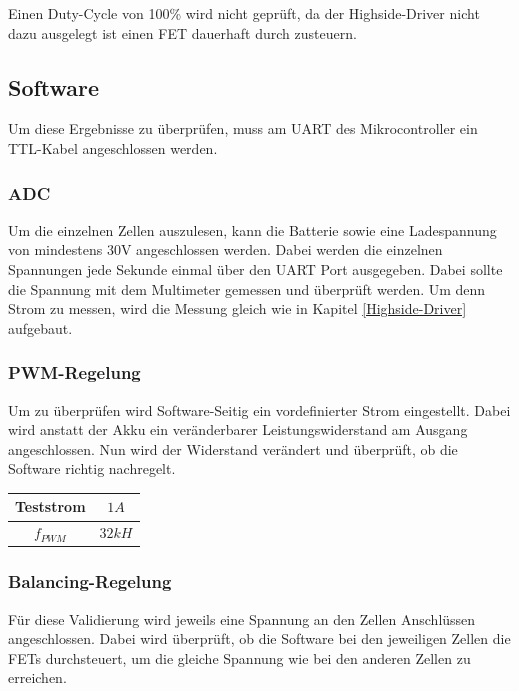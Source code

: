 Einen Duty-Cycle von 100\% wird nicht geprüft, da der Highside-Driver nicht dazu ausgelegt ist einen FET dauerhaft durch zusteuern.

\subsection*{Software}
Um diese Ergebnisse zu überprüfen, muss am UART des Mikrocontroller ein TTL-Kabel angeschlossen werden.

\subsubsection*{ADC}
Um die einzelnen Zellen auszulesen, kann die Batterie sowie eine Ladespannung von mindestens 30V angeschlossen werden. Dabei werden die einzelnen Spannungen jede Sekunde einmal über den UART Port ausgegeben. Dabei sollte die Spannung mit dem Multimeter gemessen und überprüft werden. Um denn Strom zu messen, wird die Messung gleich wie in Kapitel \ref{Highside-Driver} aufgebaut. 

\subsubsection*{PWM-Regelung}
Um zu überprüfen wird Software-Seitig ein vordefinierter Strom eingestellt. Dabei wird anstatt der Akku ein veränderbarer Leistungswiderstand am Ausgang angeschlossen. Nun wird der Widerstand verändert und überprüft, ob die Software richtig nachregelt.
\begin{center}
	\begin{tabular}{|c|c|}
		\hline 
		Teststrom & $1A$ \\ \hline
		${f}_{PWM}$ & $32kH$ \\ \hline
	\end{tabular} 
	\label{tab:LadestromHighsideDriver}
\end{center}

\subsubsection{Balancing-Regelung}
Für diese Validierung wird jeweils eine Spannung an den Zellen Anschlüssen angeschlossen. Dabei wird überprüft, ob die Software bei den jeweiligen Zellen die FETs durchsteuert, um  die gleiche Spannung wie bei den anderen Zellen zu erreichen.


